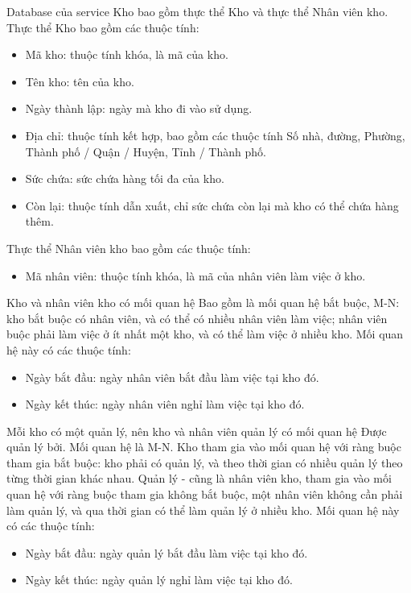 \par Database của service Kho bao gồm thực thể Kho và thực thể Nhân viên kho. Thực thể Kho bao gồm các thuộc tính:
\begin{itemize}
	\item Mã kho: thuộc tính khóa, là mã của kho.
	\item Tên kho: tên của kho.
	\item Ngày thành lập: ngày mà kho đi vào sử dụng.
	\item Địa chỉ: thuộc tính kết hợp, bao gồm các thuộc tính Số nhà, đường, Phường, Thành phố / Quận / Huyện, Tỉnh / Thành phố.
	\item Sức chứa: sức chứa hàng tối đa của kho.
	\item Còn lại: thuộc tính dẫn xuất, chỉ sức chứa còn lại mà kho có thể chứa hàng thêm.
\end{itemize}

\par Thực thể Nhân viên kho bao gồm các thuộc tính:
\begin{itemize}
	\item Mã nhân viên: thuộc tính khóa, là mã của nhân viên làm việc ở kho.
\end{itemize}

\par Kho và nhân viên kho có mối quan hệ Bao gồm là mối quan hệ bắt buộc, M-N: kho bắt buộc có nhân viên, và có thể có nhiều nhân viên làm việc; nhân viên buộc phải làm việc ở ít nhất một kho, và có thể làm việc ở nhiều kho. Mối quan hệ này có các thuộc tính:
\begin{itemize}
	\item Ngày bắt đầu: ngày nhân viên bắt đầu làm việc tại kho đó.
	\item Ngày kết thúc: ngày nhân viên nghỉ làm việc tại kho đó.
\end{itemize}

\par Mỗi kho có một quản lý, nên kho và nhân viên quản lý có mối quan hệ Được quản lý bởi. Mối quan hệ là M-N. Kho tham gia vào mối quan hệ với ràng buộc tham gia bắt buộc: kho phải có quản lý, và theo thời gian có nhiều quản lý theo từng thời gian khác nhau. Quản lý - cũng là nhân viên kho, tham gia vào mối quan hệ với ràng buộc tham gia không bắt buộc, một nhân viên không cần phải làm quản lý, và qua thời gian có thể làm quản lý ở nhiều kho. Mối quan hệ này có các thuộc tính:
\begin{itemize}
	\item Ngày bắt đầu: ngày quản lý bắt đầu làm việc tại kho đó.
	\item Ngày kết thúc: ngày quản lý nghỉ làm việc tại kho đó.
\end{itemize}

